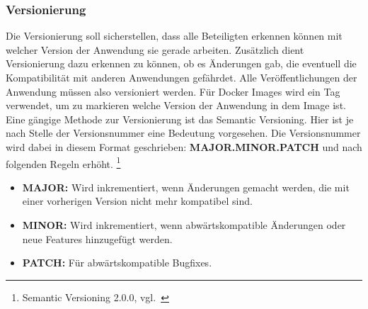 %
%
%


\subsubsection{Versionierung}

Die Versionierung soll sicherstellen, dass alle Beteiligten erkennen können mit welcher Version der Anwendung sie gerade arbeiten.
Zusätzlich dient Versionierung dazu erkennen zu können, ob es Änderungen gab, die eventuell die Kompatibilität mit anderen Anwendungen gefährdet.
Alle Veröffentlichungen der Anwendung müssen also versioniert werden.
Für Docker Images wird ein Tag verwendet, um zu markieren welche Version der Anwendung in dem Image ist. \\

Eine gängige Methode zur Versionierung ist das Semantic Versioning.
Hier ist je nach Stelle der Versionsnummer eine Bedeutung vorgesehen.
Die Versionsnummer wird dabei in diesem Format geschrieben: \textbf{MAJOR.MINOR.PATCH} und nach folgenden Regeln erhöht.
\footnote{{Semantic Versioning 2.0.0, vgl.~\cite{SEMVER}}}

\begin{itemize}
    \item \textbf{MAJOR:} Wird inkrementiert, wenn Änderungen gemacht werden, die mit einer vorherigen Version nicht mehr kompatibel sind.
    \item \textbf{MINOR:} Wird inkrementiert, wenn abwärtskompatible Änderungen oder neue Features hinzugefügt werden.
    \item \textbf{PATCH:} Für abwärtskompatible Bugfixes.
\end{itemize}

